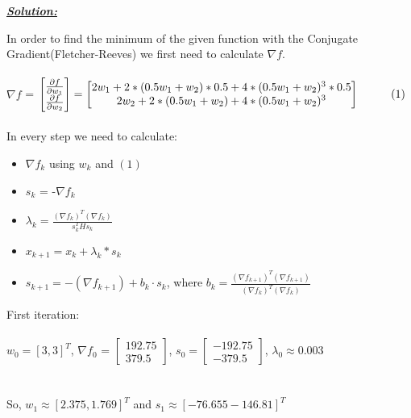 \documentclass{article}
\begin{document}
\noindent \underline{\textbf{\textit{Solution:}}}

\noindent In order to find the minimum of the given function with the Conjugate Gradient(Fletcher-Reeves) we first need to calculate \( \nabla f \). \\ \\
\( \nabla f \) = $ \begin{bmatrix}
  \frac{\partial f}{\partial w_1} \\
  \frac{\partial f}{\partial w_2} 
\end{bmatrix} = \begin{bmatrix}
  2w_1 + 2*(0.5w_1+w_2)*0.5 +4*(0.5w_1+w_2)^3 * 0.5 \\
  2w_2 +2*(0.5w_1+w_2) +4*(0.5w_1+w_2)^3 
\end{bmatrix} \hspace*{1cm}(1)$ \\ \\

\vspace{0.5cm}
\noindent In every step we need to calculate:
\begin{itemize}
  \item \( \nabla f_k \) using $w_k$ and $(1)$
  \item $s_k$ = -\( \nabla f_k \)
  \item $\lambda_k = \frac{(\nabla f_k)^T (\nabla f_k)}{s_k^T H s_k}$
  \item $x_{k+1} = x_k + \lambda_k*s_k$
  \item $s_{k+1} = -(\nabla f_{k+1}) + b_k \cdot s_k$, where $b_k = \frac{(\nabla f_{k+1})^T (\nabla f_{k+1})}{(\nabla f_{k})^T (\nabla f_{k})}$
  
\end{itemize}
\vspace{1cm}
\noindent First iteration:\\\\ $w_0 = [3,3]^T$, \( \nabla f_0 \) = $ \begin{bmatrix} 
  192.75 \\
  379.5 
\end{bmatrix}$, $ s_0 = \begin{bmatrix} 
  -192.75 \\
  -379.5 
\end{bmatrix}$, $\lambda_0 \approx 0.003$\\ \\ \\ So, $w_1 \approx [2.375, 1.769]^T$ and $s_1 \approx [-76.655 -146.81]^T$
\newpage
\end{document}
